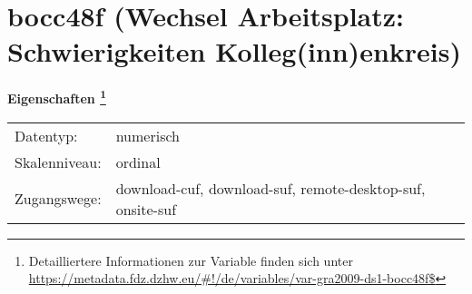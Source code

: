 
    \setcounter{footnote}{0}

    \vspace*{-1.8cm}
	\section{bocc48f (Wechsel Arbeitsplatz: Schwierigkeiten Kolleg(inn)enkreis)}
	\label{section:bocc48f}



    \vspace*{0.5cm}
    \noindent\textbf{Eigenschaften
	\footnote{Detailliertere Informationen zur Variable finden sich unter
		\url{https://metadata.fdz.dzhw.eu/\#!/de/variables/var-gra2009-ds1-bocc48f$}}}\\
	\begin{tabularx}{\hsize}{@{}lX}
	Datentyp: & numerisch \\
	Skalenniveau: & ordinal \\
	Zugangswege: &
	  download-cuf, 
	  download-suf, 
	  remote-desktop-suf, 
	  onsite-suf
 \\
    \end{tabularx}



